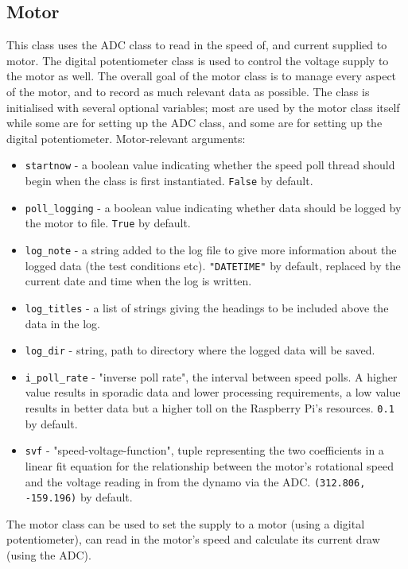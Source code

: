\documentclass[twoside,a4]{report}
\def\br{\newline \newline \noindent}
\begin{document}
	\subsection*{Motor}
	This class uses the ADC class to read in the speed of, and current supplied to motor. The digital potentiometer class is used to control the voltage supply to the motor as well. The overall goal of the motor class is to manage every aspect of the motor, and to record as much relevant data as possible. 
	\br
	The class is initialised with several optional variables; most are used by the motor class itself while some are for setting up the ADC class, and some are for setting up the digital potentiometer.
	\br
	Motor-relevant arguments:
	\begin{itemize}
		\item \texttt{startnow} - a boolean value indicating whether the speed poll thread should begin when the class is first instantiated. \texttt{False} by default.
		\item \texttt{poll\_logging} - a boolean value indicating whether data should be logged by the motor to file. \texttt{True} by default.
		\item \texttt{log\_note} - a string added to the log file to give more information about the logged data (the test conditions etc). \texttt{"DATETIME"} by default, replaced by the current date and time when the log is written.
		\item \texttt{log\_titles} - a list of strings giving the headings to be included above the data in the log.
		\item \texttt{log\_dir} - string, path to directory where the logged data will be saved.
		\item \texttt{i\_poll\_rate} - "inverse poll rate", the interval between speed polls. A higher value results in sporadic data and lower processing requirements, a low value results in better data but a higher toll on the Raspberry Pi's resources. \texttt{0.1} by default.
		\item \texttt{svf} - "speed-voltage-function", tuple representing the two coefficients in a linear fit equation for the relationship between the motor's rotational speed and the voltage reading in from the dynamo via the ADC. \texttt{(312.806, -159.196)} by default.
	\end{itemize}
	The motor class can be used to set the supply to a motor (using a digital potentiometer), can read in the motor's speed and calculate its current draw (using the ADC).
	
\end{document}
